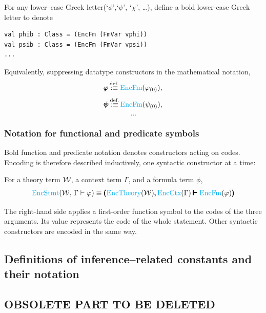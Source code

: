 \begin{notation}
For any lower--case Greek letter(`{$\phi$}',`{$\psi$}', `{$\chi$}', \dots), define a bold lower-case Greek letter to denote
\begin{lstlisting}
val phib : Class = (EncFm (FmVar vphi))
val psib : Class = (EncFm (FmVar vpsi))
...
\end{lstlisting}
Equivalently, suppressing datatype constructors in the mathematical notation,
\[
\pmb{\varphi} \,{\stackrel{{\textrm{def.}}}{:\equiv}}\, {\text{\textcolor{cyan}{EncFm}}}(\varphi_{(0)} ),
\]
\[
\pmb{\psi} \,{\stackrel{{\textrm{def.}}}{:\equiv}}\, {\text{\textcolor{cyan}{EncFm}}}(\psi_{(0)} ),
\]
\[
\dots
\]
\end{notation}

\subsubsection{Notation for functional and predicate symbols}
Bold function and predicate notation denotes constructors acting on codes.
Encoding is therefore described inductively, one syntactic constructor at a time:

\begin{definition}
For a theory term ${\mathcal{W}}$, a context term $\Gamma$, and a formula term $\phi$,
\[
{\text{\textcolor{cyan}{EncStmt}}}({\mathcal{W}},\,\Gamma\vdash \varphi)
\equiv
\pmb{(} {\text{\textcolor{cyan}{EncTheory}}}({\mathcal{W}}) \pmb{,}\, {\text{\textcolor{cyan}{EncCtx}}}(\Gamma)\pmb{\pmb{\vdash}} {\text{\textcolor{cyan}{EncFm}}}(\varphi)\pmb{)}
\]
\end{definition}
The right-hand side applies a first-order function symbol to the codes of the
three arguments. Its value represents the code of the whole statement. Other
syntactic constructors are encoded in the same way.

\subsection{Definitions of inference--related constants and their notation}
\iffalse
\subsection{OBSOLETE PART TO BE DELETED}

